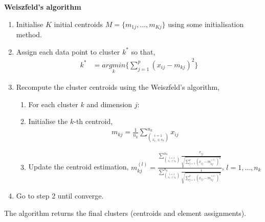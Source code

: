\documentclass[12pt]{article}
\begin{document}
\begin{center}
	\begin{tcolorbox}[breakable,colback=white!100!white,colframe=black!100!black]
		\noindent\textbf{Weiszfeld's algorithm}\label{algoweis}
		\begin{enumerate}
			\item Initialise $K$ initial centroids $M = \{m_{1j}, \dots, m_{Kj}\}$ using some initialisation method. 
			
			\item Assign each data point to cluster $k^*$ so that,
			\begin{align}\nonumber
			k^* &= \underset{k}{argmin}\bigg\{ \sum_{j=1}^{p} (x_{ij}-m_{kj})^2    \bigg\}
			\end{align}		
			
			\item Recompute the cluster centroids using the Weiszfeld's algorithm,
			
			\begin{enumerate}
				\item For each cluster $k$ and dimension $j$:
				\item Initialise the $k$-th centroid,
				\begin{align}\nonumber
				m_{kj} = \frac{1}{n_k}\sum_{\binom{i=1}{x_{i:} \in c_k}}^{n_k} x_{ij}
				\end{align}	
				\item Update the centroid estimation, $m_{kj}^{(l)} = \frac{\sum_{\binom{i=1}{x_{i:} \in c_k}}^{n_k} \frac{x_{ij}}{
						\sqrt{		\sum_{j=1}^{p}
							(x_{ij}-m_{kj}^{(l)})^2}}}{\sum_{\binom{i=1}{x_{i:} \in c_k}}^{n_k}\frac{1}{
						\sqrt{		\sum_{j=1}^{p}
							(x_{ij}-m_{kj}^{(l)})^2}}}$, $l = 1, \dots, n_k$
			\end{enumerate}			
			
			\item Go to step 2 until converge.	
			
		\end{enumerate}	
		The algorithm returns the final clusters (centroids and element assignments).
	\end{tcolorbox}
\end{center}	
	

\cleardoublepage	
	
\end{document}
